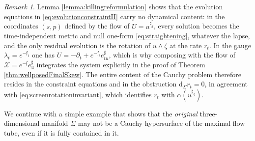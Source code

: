 \documentclass[10pt,reqno,a4paper]{amsart}
\theoremstyle{plain}
\theoremstyle{definition}
\theoremstyle{remark}
\newtheorem{remark}[thm]{Remark}
\theoremstyle{remark}
\def\dd{\mathrm{d}}
\def\cX{\mathcal{X}}
\renewcommand{\(}{ (}
\renewcommand{\)}{ )}
\newcommand{\frf}{\mathfrak{f}}
\begin{document}
\begin{remark}
\label{remark:evolutionisgauge}
Lemma \ref{lemma:killingreformulation} shows that the evolution equations in \eqref{eq:evolutionconstraintII} carry no dynamical content: in the coordinates $(s,p)$ defined by the flow of $U = u^{\sharp_g}$, every solution becomes the time-independent metric and null one-form \eqref{eq:straightening}, whatever the lapse, and the only residual evolution is the rotation of $u\wedge\zeta$ at the rate $r_t$. In the gauge $\lambda_t = e^{-\frf_t}$ one has $U = -\partial_t + e^{-\frf_t}e^{\sharp}_{tu}$, which is why composing with the flow of $\cX = e^{-\frf}e^{\sharp}_u$ integrates the system explicitly in the proof of Theorem \ref{thm:wellposedFinalSkew}. The entire content of the Cauchy problem therefore resides in the constraint equations and in the obstruction $\dd_{\Sigma}r_t = 0$, in agreement with \eqref{eq:screenrotationinvariant}, which identifies $r_t$ with $\alpha(u^{\sharp_g})$.
\end{remark}

\noindent
We continue with a simple example that shows that the \emph{original} three-dimensional manifold $\Sigma$ may not be a Cauchy hypersurface of the maximal flow tube, even if it is fully contained in it.
\end{document}
